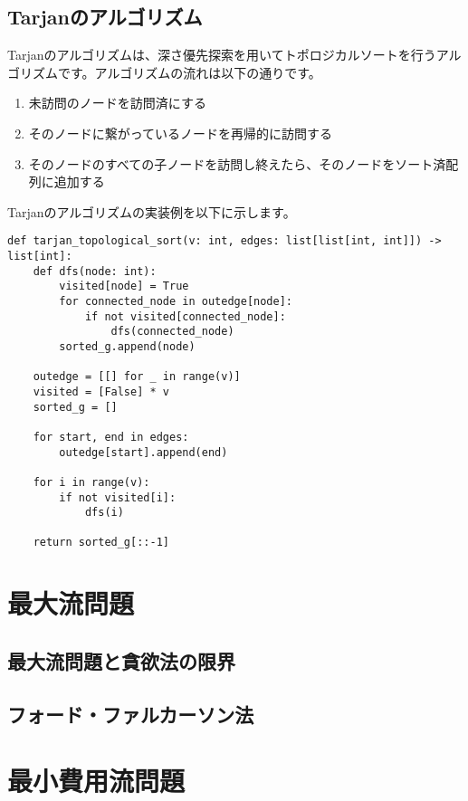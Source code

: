 \subsection{Tarjanのアルゴリズム}
Tarjanのアルゴリズムは、深さ優先探索を用いてトポロジカルソートを行うアルゴリズムです。アルゴリズムの流れは以下の通りです。

\begin{enumerate}
  \item 未訪問のノードを訪問済にする
  \item そのノードに繋がっているノードを再帰的に訪問する
  \item そのノードのすべての子ノードを訪問し終えたら、そのノードをソート済配列に追加する
\end{enumerate}

Tarjanのアルゴリズムの実装例を以下に示します。

\begin{lstlisting}[caption=Tarjanのアルゴリズムの実装, label=tarjan, frame=TRBL, label={tarjan}]
def tarjan_topological_sort(v: int, edges: list[list[int, int]]) -> list[int]:
    def dfs(node: int):
        visited[node] = True
        for connected_node in outedge[node]:
            if not visited[connected_node]:
                dfs(connected_node)
        sorted_g.append(node)
    
    outedge = [[] for _ in range(v)]
    visited = [False] * v
    sorted_g = []
    
    for start, end in edges:
        outedge[start].append(end)
    
    for i in range(v):
        if not visited[i]:
            dfs(i)
    
    return sorted_g[::-1]
\end{lstlisting}

\newpage

\section{最大流問題}
\subsection{最大流問題と貪欲法の限界}
\subsection{フォード・ファルカーソン法}

\section{最小費用流問題}

